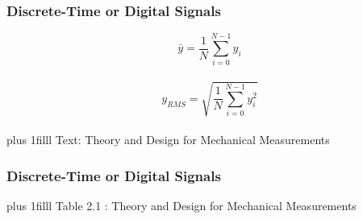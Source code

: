 \documentclass[fleqn]{beamer} %
\newcommand{\sectiontitleIV}{Discrete-Time or Digital Signals}
\newcommand{\btVFill}{\vskip0pt plus 1filll}
\begin{document}
\begin{frame}[label=sectionIV] \small
\frametitle{\sectiontitleIV}
\bigskip

\[\bar{y}=\frac{1}{N}\sum\limits_{i=0}^{N-1} y_i\] \vspace{10mm}\\	
\[y_{RMS}=\sqrt{\frac{1}{N}\sum\limits_{i=0}^{N-1} y_i^2}\] \vspace{10mm}\\	

\btVFill
\tiny{Text: Theory and Design for Mechanical Measurements}	
\end{frame}

\begin{frame}[label=sectionIV] \small
\frametitle{\sectiontitleIV}
\bigskip



\btVFill
\tiny{Table 2.1 : Theory and Design for Mechanical Measurements}	
\end{frame}
\end{document}
